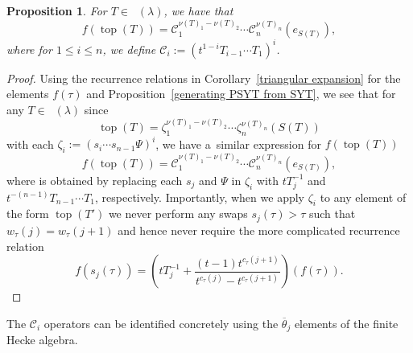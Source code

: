\documentclass[pdftex]{sigma}
\numberwithin{equation}{section}
\newtheorem{Proposition}[Theorem]{Proposition}
\theoremstyle{definition}
\DeclareMathOperator{\RYT}{\mathrm{RYT}_{\geq 0}}
\DeclareMathOperator{\RSSYT}{\mathrm{RSSYT}_{\geq 0}}
\DeclareMathOperator{\Top}{\mathrm{top}}
\begin{document}
\begin{Proposition}\label{creation operators action}
 For $T \in \RYT(\lambda)$, we have that
 \[
 f(\Top(T)) = \mathscr{C}_1^{\nu(T)_1 - \nu(T)_2}\cdots \mathscr{C}_n^{\nu(T)_n}(e_{S(T)}),
 \]
 where for $1 \leq i \leq n$, we define
 $\mathscr{C}_i:= \left( t^{1-i} T_{i-1}\cdots T_1 \right)^{i}$.
\end{Proposition}

\begin{proof}
 Using the recurrence relations in Corollary~\ref{triangular expansion} for the elements $f(\tau)$ and Proposition~\ref{generating PSYT from SYT}, we see that for any $T\in \RSSYT(\lambda)$ since
 \[
 \Top(T) = \zeta_1^{\nu(T)_1 - \nu(T)_2}\cdots \zeta_n^{\nu(T)_n}(S(T))
 \]
 with each $\zeta_i:= (s_i\cdots s_{n-1}\Psi)^{i}$, we have a~similar expression for $f(\Top(T))$
 \[
 f(\Top(T))= \mathscr{C}_1^{\nu(T)_1 - \nu(T)_2}\cdots \mathscr{C}_n^{\nu(T)_n}(e_{S(T)}),
 \]
 where  is obtained by replacing each $s_j$ and $\Psi$ in $\zeta_i$ with $tT_j^{-1}$ and $t^{-(n-1)}T_{n-1}\cdots T_1$, respectively. Importantly, when we apply $\zeta_i$ to any element of the form $\Top(T')$ we never perform any swaps $s_j(\tau) > \tau$ such that~${w_{\tau}(j) = w_{\tau}(j+1)}$ and hence never require the more complicated recurrence relation
 \[
 f(s_j(\tau)) = \left( tT_j^{-1} + \frac{(t-1)t^{c_{\tau}(j+1)}}{t^{c_{\tau}(j)} - t^{c_{\tau}(j+1)}} \right)(f(\tau)).\tag*{\qed}
 \] \renewcommand{\qed}{}
\end{proof}

The $\mathscr{C}_i$ operators can be identified concretely using the $\overline{\theta}_j$ elements of the finite Hecke algebra.
\end{document}
